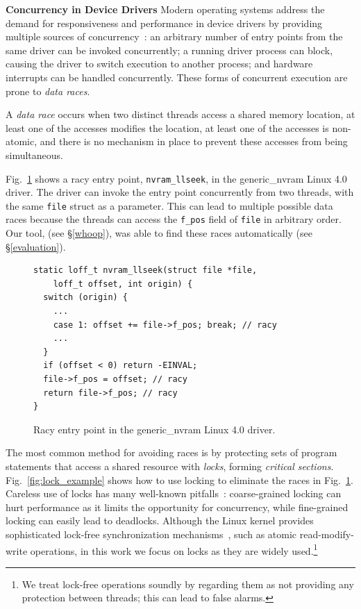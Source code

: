 \noindent\textbf{Concurrency in Device Drivers }
%
Modern operating systems address the demand for responsiveness and performance in device drivers by providing multiple sources of concurrency~\cite{corbet2005linux}: an arbitrary number of entry points from the same driver can be invoked concurrently; a running driver process can block, causing the driver to switch execution to another process; and hardware interrupts can be handled concurrently.  These forms of concurrent execution are prone to \emph{data races}.

\begin{definition}
\label{definition:datarace}
A \emph{data race} occurs when two distinct threads access a shared memory location, at least one of the accesses modifies the location, at least one of the accesses is non-atomic, and there is no mechanism in place to prevent these accesses from being simultaneous.
\end{definition}

Fig.~\ref{fig:data_race_example} shows a racy entry point, \texttt{nvram\_llseek}, in the generic\_nvram Linux 4.0 driver. The driver can invoke the entry point concurrently from two threads, with the same \texttt{file} struct as a parameter. This can lead to multiple possible data races because the threads can access the \texttt{f\_pos} field of \texttt{file} in arbitrary order. Our tool, \whoop (see \S\ref{whoop}), was able to find these races automatically (see \S\ref{evaluation}).

\begin{figure}[t]
\begin{lstlisting}
static loff_t nvram_llseek(struct file *file,
    loff_t offset, int origin) {
  switch (origin) {
    ...
    case 1: offset += file->f_pos; break; // racy
    ...
  }
  if (offset < 0) return -EINVAL;
  file->f_pos = offset; // racy
  return file->f_pos; // racy
}
\end{lstlisting}
\vspace{-2mm}
\caption{Racy entry point in the generic\_nvram Linux 4.0 driver.}
\label{fig:data_race_example}
\end{figure}

The most common method for avoiding races is by protecting sets of program statements that access a shared resource with \emph{locks}, forming \emph{critical sections}.  Fig.~\ref{fig:lock_example} shows how to use locking to eliminate the races in Fig.~\ref{fig:data_race_example}. 
%
Careless use of locks has many well-known pitfalls~\cite{sutter2005software}: coarse-grained locking can hurt performance as it limits the opportunity for concurrency, while fine-grained locking can easily lead to deadlocks. Although the Linux kernel provides sophisticated lock-free synchronization mechanisms~\cite[p.\ 123]{corbet2005linux}, such as atomic read-modify-write operations, in this work we focus on locks as they are widely used.\footnote{We treat lock-free operations soundly by regarding them as not providing any protection between threads; this can lead to false alarms.}

